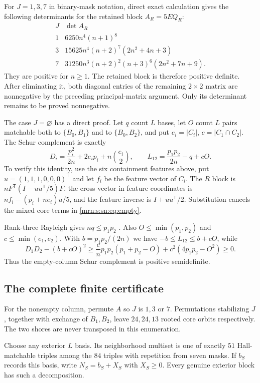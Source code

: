 \documentclass[11pt,a4paper]{article}
\theoremstyle{remark}\newtheorem{remark}[theorem]{Remark}
\begin{document}
For $J=1,3,7$ in binary-mask notation, direct exact calculation gives the
following determinants for the retained block $A_R=5E Q_R$:
\[
\begin{array}{c|l}
J&\det A_R\\ \hline
1&6250n^4(n+1)^8\\
3&15625n^4(n+2)^7(2n^2+4n+3)\\
7&31250n^3(n+2)^2(n+3)^6(2n^2+7n+9).
\end{array}
\]
They are positive for $n\ge1$. The retained block is therefore positive
definite. After eliminating it, both diagonal entries of the remaining
$2\times2$ matrix are nonnegative by the preceding principal-matrix argument.
Only its determinant remains to be proved nonnegative.

The case $J=\varnothing$ has a direct proof. Let $q$ count $L$ bases, let
$O$ count $L$ pairs matchable both to $\{B_0,B_1\}$ and to $\{B_0,B_2\}$,
and put $e_i=|C_i|$, $c=|C_1\cap C_2|$.
The Schur complement is exactly
\begin{equation}\label{mrn:s:sn:eq:empty}
 D_i=\frac{p_i^2}{2n}+2e_ip_i+n\binom{e_i}{2},\qquad
 L_{12}=\frac{p_1p_2}{2n}-q+cO.
\end{equation}
To verify this identity, use the six containment features above, put
$u=(1,1,1,0,0,0)^{\mathsf T}$ and let $f_i$ be the feature vector of $C_i$.
The $R$ block is $nF^{\mathsf T}(I-uu^{\mathsf T}/5)F$,
the cross vector in feature coordinates is
$nf_i-(p_i+ne_i)u/5$, and the feature inverse is $I+uu^{\mathsf T}/2$.
Substitution cancels the mixed core terms in \eqref{mrn:s:sn:eq:empty}.

Rank-three Rayleigh gives $nq\le p_1p_2$ \cite{b:Wagner}.
Also $O\le\min(p_1,p_2)$ and $c\le\min(e_1,e_2)$.
With $b=p_1p_2/(2n)$ we have $-b\le L_{12}\le b+cO$, while
\[
 D_1D_2-(b+cO)^2\ge
 \frac cn p_1p_2(p_1+p_2-O)+c^2(4p_1p_2-O^2)\ge0.
\]
Thus the empty-column Schur complement is positive semidefinite.

\subsection{The complete finite certificate}\label{mrn:s:sn:sec:certificate}
For the nonempty column, permute $A$ so $J$ is $1,3$ or $7$.
Permutations stabilizing $J$, together with exchange of $B_1,B_2$, leave
$24,24,13$ rooted core orbits respectively. The two shores are never transposed
in this enumeration.

Choose any exterior $L$ basis. Its neighborhood multiset is one of exactly
$51$ Hall-matchable triples among the $84$ triples with repetition from seven
masks. If $b_S$ records this basis, write $N_S=b_S+X_S$ with $X_S\ge0$.
Every genuine exterior block has such a decomposition.
\end{document}

